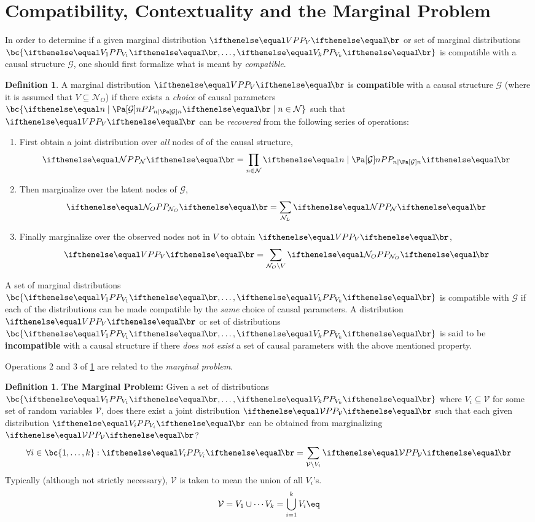 \documentclass[aps, 10pt, english, twoside, pra, longbibliography]{revtex4-1}
\theoremstyle{plain}
\theoremstyle{definition}
\newtheorem{definition}[theorem]{Definition}
\theoremstyle{remark}
\newcommand{\graph}{\mathcal{G}}
\newcommand{\nodes}{\mathcal{N}}
\newcommand{\term}[1]{\textcolor{Mahogany}{\textbf{#1}}}
\begin{document}
    \section{Compatibility, Contextuality and the Marginal Problem}
    In order to determine if a given marginal distribution $\prob[V]$ or set of marginal distributions $\bc{\prob[V_1], \ldots, \prob[V_k]}$ is compatible with a causal structure $\graph$, one should first formalize what is meant by \textit{compatible}.
    \begin{definition}
        \label{def:compatible}
        A marginal distribution $\prob[V]$ is \term{compatible} with a causal structure $\graph$ (where it is assumed that $V \subseteq \nodes_O$) if there exists a \textit{choice} of causal parameters $\bc{\prob[n \mid \Pa[\graph]{n}] \mid n \in \nodes}$ such that $\prob[V]$ can be \textit{recovered} from the following series of operations:

        \begin{enumerate}
            \item First obtain a joint distribution over \textit{all} nodes of of the causal structure,
            \[ \prob[\nodes] = \prod_{n \in \nodes} \prob[n \mid \Pa[\graph]{n}] \]
            \item Then marginalize over the latent nodes of $\graph$,
            \[ \prob[\nodes_O] = \sum_{\nodes_L} \prob[\nodes] \]
            \item Finally marginalize over the observed nodes not in $V$ to obtain $\prob[V]$,
            \[ \prob[V] = \sum_{\nodes_O \setminus V} \prob[\nodes_O] \]
        \end{enumerate}
        A set of marginal distributions $\bc{\prob[V_1], \ldots, \prob[V_k]}$ is compatible with $\graph$ if each of the distributions can be made compatible by the \textit{same} choice of causal parameters.
        A distribution $\prob[V]$ or set of distributions $\bc{\prob[V_1], \ldots, \prob[V_k]}$ is said to be \term{incompatible} with a causal structure if there \textit{does not exist} a set of causal parameters with the above mentioned property.

    \end{definition}

    Operations 2 and 3 of \cref{def:compatible} are related to the \textit{marginal problem}.
    \begin{definition}
        \label{def:marginal_problem}
        \term{The Marginal Problem:} Given a set of distributions $\bc{\prob[V_1], \ldots, \prob[V_k]}$ where $V_i \subseteq \mathcal{V}$ for some set of random variables $\mathcal{V}$, does there exist a joint distribution $\prob[\mathcal{V}]$ such that each given distribution $\prob[V_i]$ can be obtained from marginalizing $\prob[\mathcal{V}]$?
        \[ \forall i \in \bc{1, \ldots, k} : \prob[V_i] = \sum_{\mathcal{V} \setminus V_i} \prob[\mathcal{V}] \]
        Typically (although not strictly necessary), $\mathcal{V}$ is taken to mean the union of all $V_i$'s.
        \[ \mathcal{V} = V_1 \cup \cdots V_k = \bigcup_{i=1}^{k} V_i \eq \label{eq:marginals_union} \]
    \end{definition}
\end{document}
